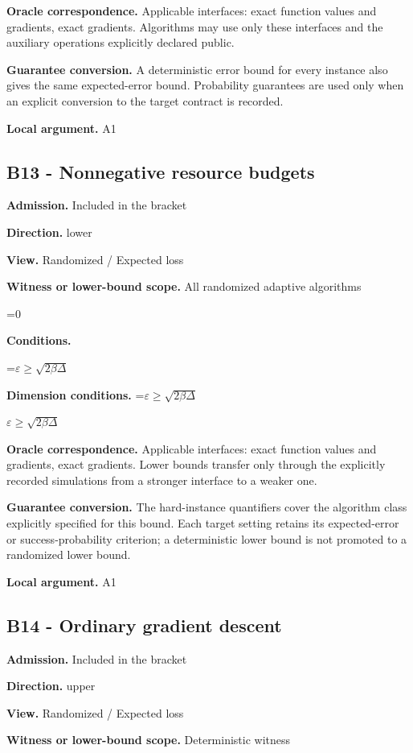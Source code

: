 \documentclass[10pt,a4paper]{article}
\newcommand{\AtlasMath}[1]{\par\begingroup\centering\setbox0=\hbox{$\displaystyle #1$}\ifdim\wd0>1.4\linewidth\typeout{ATLAS WIDE FORMULA: \the\wd0}\fi\ifdim\wd0>\linewidth\resizebox{\linewidth}{!}{\box0}\else\box0\fi\par\endgroup}
\newcommand{\AtlasInlineMath}[1]{\begingroup\setbox0=\hbox{$#1$}\ifdim\wd0>.4\linewidth\endgroup\AtlasMath{#1}\else\endgroup$#1$\fi}
\begin{document}
\textbf{Oracle correspondence.} Applicable interfaces: exact function values and gradients, exact gradients. Algorithms may use only these interfaces and the auxiliary operations explicitly declared public.

\textbf{Guarantee conversion.} A deterministic error bound for every instance also gives the same expected-error bound. Probability guarantees are used only when an explicit conversion to the target contract is recorded.

\textbf{Local argument.} A1

\subsection{B13 - Nonnegative resource budgets}
\textbf{Admission.} Included in the bracket

\textbf{Direction.} lower

\textbf{View.} Randomized / Expected loss

\textbf{Witness or lower-bound scope.} All randomized adaptive algorithms

\AtlasMath{0}
\textbf{Conditions.} 
\AtlasMath{\varepsilon\ge\sqrt{2\beta\Delta}}


\textbf{Dimension conditions.} \AtlasInlineMath{\varepsilon\ge\sqrt{2\beta\Delta}}

\textbf{Oracle correspondence.} Applicable interfaces: exact function values and gradients, exact gradients. Lower bounds transfer only through the explicitly recorded simulations from a stronger interface to a weaker one.

\textbf{Guarantee conversion.} The hard-instance quantifiers cover the algorithm class explicitly specified for this bound. Each target setting retains its expected-error or success-probability criterion; a deterministic lower bound is not promoted to a randomized lower bound.

\textbf{Local argument.} A1

\subsection{B14 - Ordinary gradient descent}
\textbf{Admission.} Included in the bracket

\textbf{Direction.} upper

\textbf{View.} Randomized / Expected loss

\textbf{Witness or lower-bound scope.} Deterministic witness
\end{document}
